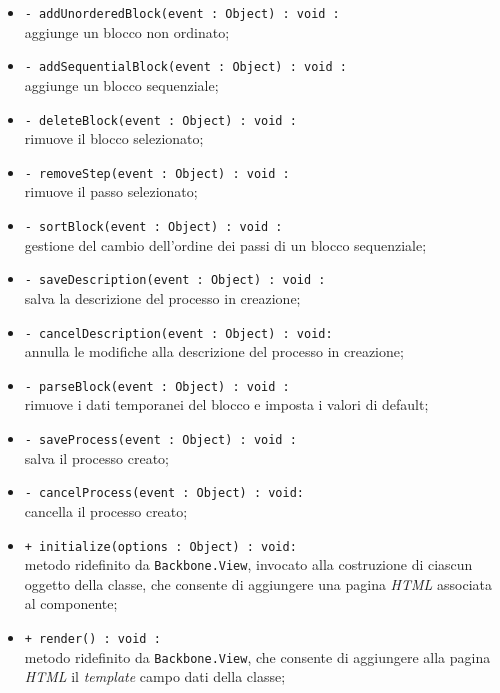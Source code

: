 \begin{flushleft}
\begin{itemize}
\begin{sloppypar}
\begin{itemize}
\item \texttt{- addUnorderedBlock(event : Object) : void :}\\ aggiunge un blocco non ordinato;
\item \texttt{- addSequentialBlock(event : Object) : void :}\\ aggiunge un blocco sequenziale;
\item \texttt{- deleteBlock(event : Object) : void :}\\ rimuove il blocco selezionato;
\item \texttt{- removeStep(event : Object) : void :}\\ rimuove il passo selezionato;
\item \texttt{- sortBlock(event : Object) : void :}\\ gestione del cambio dell'ordine dei passi di un blocco sequenziale;
\item \texttt{- saveDescription(event : Object) : void :}\\ salva la descrizione del processo in creazione;
\item \texttt{- cancelDescription(event : Object) : void:}\\ annulla le modifiche alla descrizione del processo in creazione;
\item \texttt{- parseBlock(event : Object) : void :}\\ rimuove i dati temporanei del blocco e imposta i valori di default;
\item \texttt{- saveProcess(event : Object) : void :}\\ salva il processo creato;
\item \texttt{- cancelProcess(event : Object) : void:}\\ cancella il processo creato;
\item \texttt{+ initialize(options : Object) : void:}\\ metodo ridefinito da \texttt{Backbone.View}, invocato alla costruzione di ciascun oggetto della classe, che consente di aggiungere una pagina \textit{HTML} associata al componente;
\item \texttt{+ render() : void :}\\ metodo ridefinito da \texttt{Backbone.View}, che consente di aggiungere alla pagina \textit{HTML} il \textit{template} campo dati della classe;
\end{itemize}
\end{sloppypar}
\end{itemize}
\end{flushleft}

